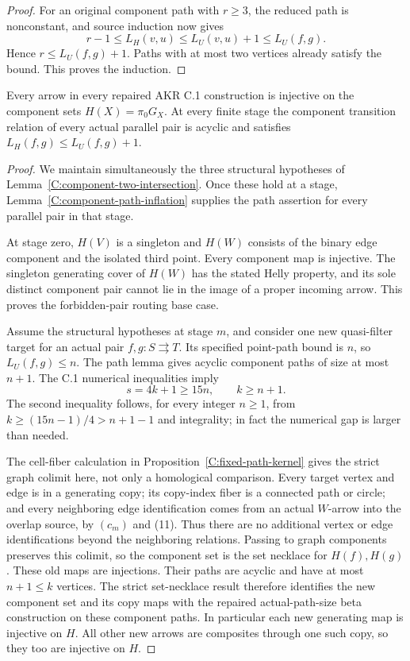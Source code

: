 \begin{proof}
For an original component path with $r\geq3$, the reduced path
is nonconstant, and source induction now gives
\[
 r-1\leq L_H(v,u)\leq L_U(v,u)+1\leq L_U(f,g).
\]
Hence $r\leq L_U(f,g)+1$. Paths with at most two vertices
already satisfy the bound. This proves the induction.
\end{proof}

\begin{theorem}
\label{C:universal-components}
Every arrow in every repaired AKR C.1 construction is injective
on the component sets $H(X)=\pi_0G_X$. At every finite stage
the component transition relation of every actual parallel pair
is acyclic and satisfies
$L_H(f,g)\leq L_U(f,g)+1$.
\end{theorem}

\begin{proof}
We maintain simultaneously the three structural hypotheses of
Lemma~\ref{C:component-two-intersection}. Once these hold
at a stage, Lemma~\ref{C:component-path-inflation} supplies
the path assertion for every parallel pair in that stage.

At stage zero, $H(V)$ is a singleton and $H(W)$ consists of the
binary edge component and the isolated third point. Every
component map is injective. The singleton generating cover of
$H(W)$ has the stated Helly property, and its sole distinct
component pair cannot lie in the image of a proper incoming
arrow. This proves the forbidden-pair routing base case.

Assume the structural hypotheses at stage $m$, and consider one
new quasi-filter target for an actual pair $f,g:S\rightrightarrows T$.
Its specified point-path bound is $n$, so
$L_U(f,g)\leq n$. The path lemma gives acyclic component paths
of size at most $n+1$. The C.1 numerical inequalities imply
\[
       s=4k+1\geq15n,\qquad k\geq n+1.
\]
The second inequality follows, for every integer $n\geq1$, from
$k\geq(15n-1)/4>n+1-1$ and integrality; in fact the numerical
gap is larger than needed.

The cell-fiber calculation in
Proposition~\ref{C:fixed-path-kernel} gives the strict graph
colimit here, not only a homological comparison. Every target
vertex and edge is in a generating copy; its copy-index fiber
is a connected path or circle; and every neighboring edge
identification comes from an actual $W$-arrow into the overlap
source, by $(c_m)$ and (11). Thus there are no additional
vertex or edge identifications beyond the neighboring relations.
Passing to graph components preserves this colimit, so the
component set is the set necklace for $H(f),H(g)$.
These old maps are injections. Their paths are acyclic and have
at most $n+1\leq k$ vertices. The strict set-necklace result
therefore identifies the new component set and its copy maps
with the repaired actual-path-size beta construction on these
component paths. In particular each new generating map is
injective on $H$. All other new arrows are composites through
one such copy, so they too are injective on $H$.


\end{proof}
